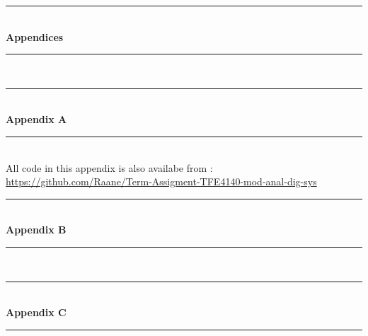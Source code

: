 \documentclass[a4paper]{IEEEtran}
\begin{document}


\nocite{*}

\clearpage
\begin{titlepage}
    \newcommand{\HRule}{\rule{\linewidth}{0.5mm}} %
    \center %
    \vspace*{3cm}
    \HRule \\[0.4cm]
    { \huge \bfseries Appendices}\\[0.4cm] %
    \HRule \\[1.5cm]
\end{titlepage}
\clearpage
\begin{titlepage}
    \newcommand{\HRule}{\rule{\linewidth}{0.5mm}} %
    \center %
    \vspace*{3cm}
    \HRule \\[0.4cm]
    { \huge \bfseries Appendix A}\\[0.4cm] %
    \HRule \\[1.5cm]
    All code in this appendix is also availabe from : \break \href{https://github.com/Raane/Term-Assigment-TFE4140-mod-anal-dig-sys}{https://github.com/Raane/Term-Assigment-TFE4140-mod-anal-dig-sys}
\end{titlepage}
%
\clearpage
\begin{titlepage}
    \newcommand{\HRule}{\rule{\linewidth}{0.5mm}} %
    \center %
    \vspace*{3cm}
    \HRule \\[0.4cm]
    { \huge \bfseries Appendix B}\\[0.4cm] %
    \HRule \\[1.5cm]
\end{titlepage}

\clearpage
\begin{titlepage}
    \newcommand{\HRule}{\rule{\linewidth}{0.5mm}} %
    \center %
    \vspace*{3cm}
    \HRule \\[0.4cm]
    { \huge \bfseries Appendix C}\\[0.4cm] %
    \HRule \\[1.5cm]
\end{titlepage}

\end{document}
